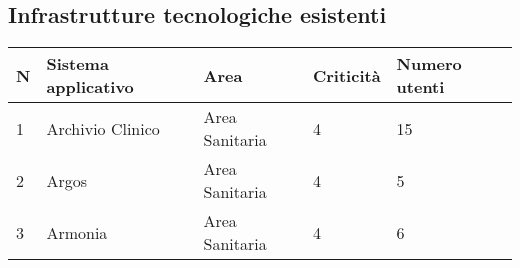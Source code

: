 	\subsection{Infrastrutture tecnologiche esistenti}

	\begin{table}[h]
		\begin{tabular}{|l|l|l|l|l|}
			\hline
			\rowcolor[HTML]{EFEFEF} 
			\textbf{N} & \textbf{Sistema applicativo} & \textbf{Area} & \textbf{Criticità} & \textbf{Numero utenti} \\ \hline
			1          & Archivio Clinico                             & Area Sanitaria              & 4                       & 15          \\ \hline
			2          & Argos                             & Area Sanitaria              & 4                       & 5          \\ \hline
			3          & Armonia                             & Area Sanitaria              & 4                       & 6          \\ \hline
		\end{tabular}
	\end{table}

	